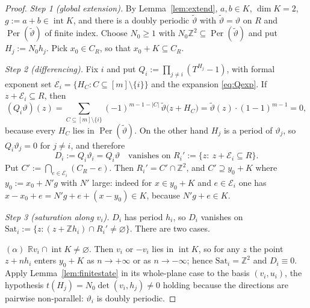 \documentclass[11pt,reqno]{amsart}
\theoremstyle{plain}
\theoremstyle{definition}
\theoremstyle{remark}
\theoremstyle{plain}
\theoremstyle{remark}
\theoremstyle{definition}
\numberwithin{equation}{section}
\DeclareMathOperator{\Per}{Per}
\newcommand{\R}{\mathbb{R}}
\newcommand{\Z}{\mathbb{Z}}
\newcommand{\cE}{\mathcal{E}}
\begin{document}
\begin{proof}
\emph{Step 1 (global extension).}  By Lemma~\ref{lem:extend}, $a,b\in K$,
$\dim K=2$, $g:=a+b\in\operatorname{int}K$, and there is a doubly periodic
$\widetilde\vartheta$ with $\widetilde\vartheta=\vartheta$ on $R$ and
$\Per(\widetilde\vartheta)$ of finite index.  Choose $N_0\ge1$ with
$N_0\Z^2\subseteq\Per(\widetilde\vartheta)$ and put $H_j:=N_0h_j$.  Pick
$x_0\in C_R$, so that $x_0+K\subseteq C_R$.

\emph{Step 2 (differencing).}  Fix $i$ and put $Q_i:=\prod_{j\ne i}(T^{H_j}-1)$,
with formal exponent set $\cE_i=\{H_C:C\subseteq[m]\setminus\{i\}\}$ and the
expansion \eqref{eq:Qexp}.  If $z+\cE_i\subseteq R$, then
\[(Q_i\vartheta)(z)=\sum_{C\subseteq[m]\setminus\{i\}}(-1)^{m-1-|C|}\,
  \widetilde\vartheta\bigl(z+H_C\bigr)
  =\widetilde\vartheta(z)\cdot(1-1)^{m-1}=0,\]
because every $H_C$ lies in $\Per(\widetilde\vartheta)$.  On the other hand
$H_j$ is a period of $\vartheta_j$, so $Q_i\vartheta_j=0$ for $j\ne i$, and
therefore
\[D_i:=Q_i\vartheta_i=Q_i\vartheta\quad\text{vanishes on }
  R_i':=\{z:\ z+\cE_i\subseteq R\}.\]
Put $C':=\bigcap_{e\in\cE_i}(C_R-e)$.  Then $R_i'=C'\cap\Z^2$, and
$C'\supseteq y_0+K$ where $y_0:=x_0+N'g$ with $N'$ large: indeed for
$x\in y_0+K$ and $e\in\cE_i$ one has
$x-x_0+e=N'g+e+(x-y_0)\in K$, because $N'g+e\in K$.

\emph{Step 3 (saturation along $v_i$).}  $D_i$ has period $h_i$, so $D_i$
vanishes on $\mathrm{Sat}_i:=\{z:(z+\Z h_i)\cap R_i'\ne\varnothing\}$.  There
are two cases.

$(\alpha)$ $\R v_i\cap\operatorname{int}K\ne\varnothing$.  Then $v_i$ or $-v_i$
lies in $\operatorname{int}K$, so for any $z$ the point $z+nh_i$ enters
$y_0+K$ as $n\to+\infty$ or as $n\to-\infty$; hence
$\mathrm{Sat}_i=\Z^2$ and $D_i\equiv0$.  Apply Lemma~\ref{lem:finitestate} in
its whole-plane case to the basis $(v_i,u_i)$, the hypothesis
$t(H_j)=N_0\det(v_i,h_j)\ne0$ holding because the directions are pairwise
non-parallel: $\vartheta_i$ is doubly periodic.


\end{proof}
\end{document}
